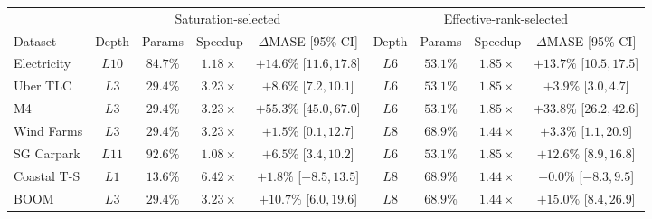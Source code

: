 \begin{tabular}{lcccccccc}
    \toprule
    & \multicolumn{4}{c}{Saturation-selected} &
      \multicolumn{4}{c}{Effective-rank-selected} \\
    \cmidrule(lr){2-5}
    \cmidrule(lr){6-9}
    Dataset & Depth & Params & Speedup & $\Delta$MASE [95\% CI] &
              Depth & Params & Speedup & $\Delta$MASE [95\% CI] \\
    \midrule
    Electricity & \(L10\) & \(84.7\%\) & \(1.18\times\) & \(+14.6\%\) [\(11.6,17.8\)] & \(L6\) & \(53.1\%\) & \(1.85\times\) & \(+13.7\%\) [\(10.5,17.5\)] \\
    Uber TLC & \(L3\) & \(29.4\%\) & \(3.23\times\) & \(+8.6\%\) [\(7.2,10.1\)] & \(L6\) & \(53.1\%\) & \(1.85\times\) & \(+3.9\%\) [\(3.0,4.7\)] \\
    M4 & \(L3\) & \(29.4\%\) & \(3.23\times\) & \(+55.3\%\) [\(45.0,67.0\)] & \(L6\) & \(53.1\%\) & \(1.85\times\) & \(+33.8\%\) [\(26.2,42.6\)] \\
    Wind Farms & \(L3\) & \(29.4\%\) & \(3.23\times\) & \(+1.5\%\) [\(0.1,12.7\)] & \(L8\) & \(68.9\%\) & \(1.44\times\) & \(+3.3\%\) [\(1.1,20.9\)] \\
    \midrule
    SG Carpark & \(L11\) & \(92.6\%\) & \(1.08\times\) & \(+6.5\%\) [\(3.4,10.2\)] & \(L6\) & \(53.1\%\) & \(1.85\times\) & \(+12.6\%\) [\(8.9,16.8\)] \\
    Coastal T-S & \(L1\) & \(13.6\%\) & \(6.42\times\) & \(+1.8\%\) [\(-8.5,13.5\)] & \(L8\) & \(68.9\%\) & \(1.44\times\) & \(-0.0\%\) [\(-8.3,9.5\)] \\
    BOOM & \(L3\) & \(29.4\%\) & \(3.23\times\) & \(+10.7\%\) [\(6.0,19.6\)] & \(L8\) & \(68.9\%\) & \(1.44\times\) & \(+15.0\%\) [\(8.4,26.9\)] \\
    \bottomrule
\end{tabular}
